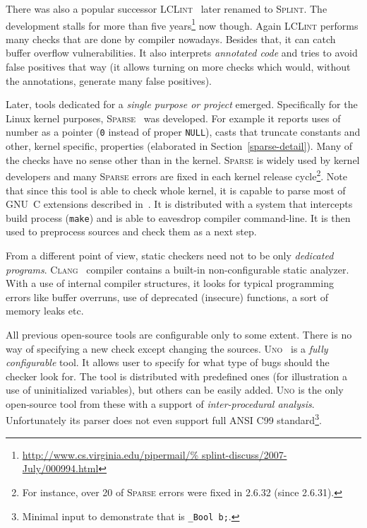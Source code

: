 \documentclass[11pt,a4paper]{article}
\begin{document}
There was also a popular successor \textsc{LCLint}~\cite{lclint} later renamed
to \textsc{Splint}. The development stalls for more than five
years\footnote{\url{http://www.cs.virginia.edu/pipermail/%
splint-discuss/2007-July/000994.html}} now though. Again \textsc{LCLint}
performs many checks that are done by compiler nowadays. Besides that, it can
catch buffer overflow vulnerabilities. It also interprets \emph{annotated
code} and tries to avoid false positives that way (it allows turning on more
checks which would, without the annotations, generate many false positives).

\label{sparse}
Later, tools dedicated for a \emph{single purpose or project} emerged.
Specifically for the Linux kernel purposes, \textsc{Sparse}~\cite{sparse} was
developed.  For example it reports uses of number as a pointer (\texttt{0}
instead of proper \texttt{NULL}), casts that truncate constants and other,
kernel specific, properties (elaborated in Section~\ref{sparse-detail}). Many
of the checks have no sense other than in the kernel. \textsc{Sparse} is
widely used by kernel developers and many \textsc{Sparse} errors are fixed in
each kernel release cycle\footnote{For instance, over 20 of \textsc{Sparse}
errors were fixed in 2.6.32 (since 2.6.31).}. Note that since this tool is
able to check whole kernel, it is capable to parse most of GNU~C extensions
described in~\cite{gcc}. It is distributed with a system that intercepts build
process (\texttt{make}) and is able to eavesdrop compiler command-line. It
is then used to preprocess sources and check them as a next step.

From a different point of view, static checkers need not to be only
\emph{dedicated programs}. \textsc{Clang}~\cite{clang} compiler contains a
built-in non-configurable static analyzer. With a use of internal compiler
structures, it looks for typical programming errors like buffer overruns,
use of deprecated (insecure) functions, a sort of memory leaks etc.

All previous open-source tools are configurable only to some extent. There is
no way of specifying a new check except changing the sources.
\textsc{Uno}~\cite{uno} is a \emph{fully configurable} tool. It allows user to
specify for what type of bugs should the checker look for. The tool is
distributed with predefined ones (for illustration a use of uninitialized
variables), but others can be easily added. \textsc{Uno} is the only
open-source tool from these with a support of \emph{inter-procedural
analysis}. Unfortunately its parser does not even support full ANSI
C99 standard\footnote{Minimal input to demonstrate that is \texttt{\_Bool
b;}.}.
\end{document}
